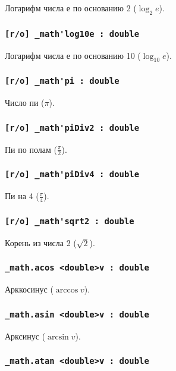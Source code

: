 Логарифм числа е по основанию 2 ($\log_{2}{e}$).

\subsubsection{\lstinline|[r/o] _math'log10e : double|}

Логарифм числа е по основанию 10 ($\log_{10}{e}$).

\subsubsection{\lstinline|[r/o] _math'pi : double|}

Число пи ($\pi$).

\subsubsection{\lstinline|[r/o] _math'piDiv2 : double|}

Пи по полам ($\frac{\pi}{2}$).

\subsubsection{\lstinline|[r/o] _math'piDiv4 : double|}

Пи на 4 ($\frac{\pi}{4}$).

\subsubsection{\lstinline|[r/o] _math'sqrt2 : double|}

Корень из числа 2 ($\sqrt{2}$).

\subsubsection{\lstinline|_math.acos <double>v : double|}

Арккосинус ($\arccos{v}$).

\subsubsection{\lstinline|_math.asin <double>v : double|}

Арксинус ($\arcsin{v}$).

\subsubsection{\lstinline|_math.atan <double>v : double|}

